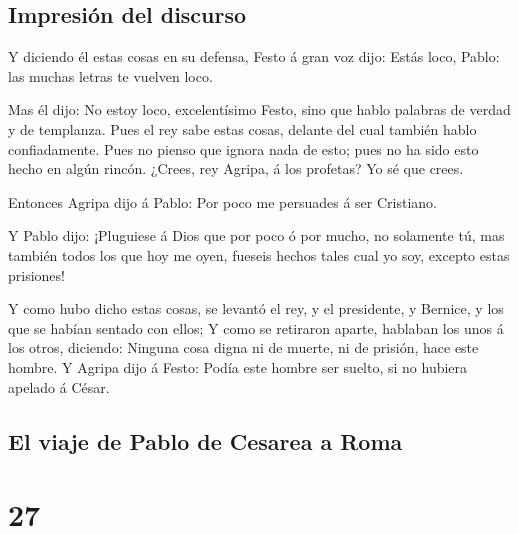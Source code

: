 \hypertarget{impresiuxf3n-del-discurso}{%
\subsection{Impresión del discurso}\label{impresiuxf3n-del-discurso}}

 Y diciendo él estas cosas en su defensa, Festo á gran
voz dijo: Estás loco, Pablo: las muchas letras te vuelven loco.

 Mas él dijo: No estoy loco, excelentísimo Festo, sino
que hablo palabras de verdad y de templanza.  Pues el rey
sabe estas cosas, delante del cual también hablo confiadamente. Pues no
pienso que ignora nada de esto; pues no ha sido esto hecho en algún
rincón.  ¿Crees, rey Agripa, á los profetas? Yo sé que
crees.

 Entonces Agripa dijo á Pablo: Por poco me persuades á
ser Cristiano.

 Y Pablo dijo: ¡Pluguiese á Dios que por poco ó por
mucho, no solamente tú, mas también todos los que hoy me oyen, fueseis
hechos tales cual yo soy, excepto estas prisiones!

 Y como hubo dicho estas cosas, se levantó el rey, y el
presidente, y Bernice, y los que se habían sentado con ellos;
 Y como se retiraron aparte, hablaban los unos á los
otros, diciendo: Ninguna cosa digna ni de muerte, ni de prisión, hace
este hombre.  Y Agripa dijo á Festo: Podía este hombre
ser suelto, si no hubiera apelado á César.

\hypertarget{el-viaje-de-pablo-de-cesarea-a-roma}{%
\subsection{El viaje de Pablo de Cesarea a
Roma}\label{el-viaje-de-pablo-de-cesarea-a-roma}}

\hypertarget{section-26}{%
\section{27}\label{section-26}}

